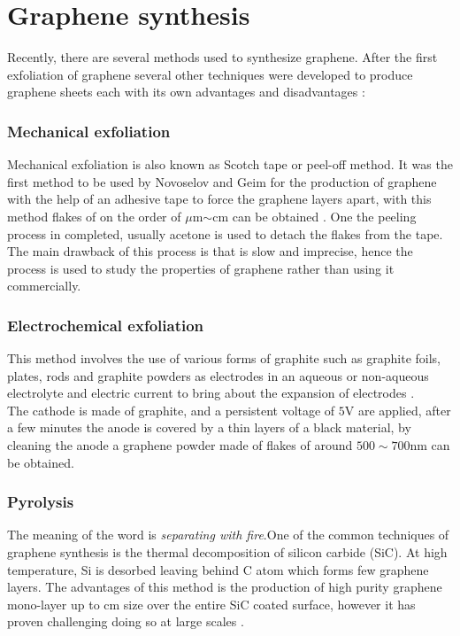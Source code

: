 \section{Graphene synthesis}
Recently, there are several methods used to synthesize graphene. After the first exfoliation of graphene \cite{firstExfoliation} several other techniques were developed to produce graphene sheets each with its own advantages and disadvantages \cite{mbayachi2021graphene}:



\subsubsection*{Mechanical exfoliation}
Mechanical exfoliation is also known as Scotch tape or peel-off method. It was the first method to be used by Novoselov and Geim for the production of graphene with the help of an adhesive tape to force the graphene layers apart, with this method flakes of on the order of $\mu$m$\sim$cm can be obtained \cite{firstExfoliation,edwards2013graphene,van2012production}. One the peeling process in completed, usually acetone is used to detach the flakes from the tape.
The main drawback of this process is that is slow and imprecise, hence the process is used to study the properties of graphene rather than using it commercially.

\subsubsection*{Electrochemical exfoliation}
This method involves the use of various forms of graphite such as graphite foils, plates, rods and graphite powders as electrodes in an aqueous or non-aqueous electrolyte and electric current to bring about the expansion of electrodes \cite{liu2019synthesis,yang2016new,luheng2009influence}.\\
The cathode is made of graphite, and a persistent voltage of $5$V are applied, after a few minutes the anode is covered by a thin layers of a black material, by cleaning the anode a graphene powder made of flakes of around $500\sim 700$nm can be obtained.


\subsubsection*{Pyrolysis}
The meaning of the word is \textit{separating with fire}.One of the common techniques of graphene synthesis is the thermal decomposition of silicon carbide (SiC). At high temperature, Si is desorbed leaving behind C atom which forms few graphene layers. The advantages of this method is the production of high purity graphene mono-layer up to cm size over the entire SiC coated surface, however it has proven challenging doing so at large scales \cite{shams2015synthesis,hibino2010graphene,juang2009synthesis,pan2009highly}.

